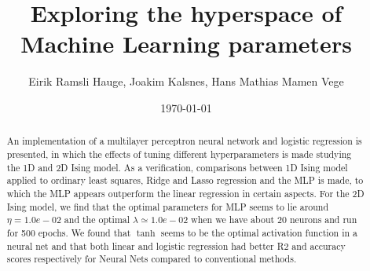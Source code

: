 \documentclass[11pt]{article}
\title{Exploring the hyperspace of Machine Learning parameters}
\author{Eirik Ramsli Hauge, Joakim Kalsnes, Hans Mathias Mamen Vege}
\date{\today}
\begin{document}
\maketitle

\begin{abstract}
An implementation of a multilayer perceptron neural network and logistic regression is presented, in which the effects of tuning different hyperparameters is made studying the 1D and 2D Ising model. As a verification, comparisons between 1D Ising model applied to ordinary least squares, Ridge and Lasso regression and the MLP is made, to which the MLP appears outperform the linear regression in certain aspects. For the 2D Ising model, we find that the optimal parameters for MLP seems to lie around $\eta= 1.0e-02$ and the optimal $\lambda \simeq 1.0e-02$ when we have about 20 neurons and run for 500 epochs. We found that $\tanh$ seems to be the optimal activation function in a neural net and that both linear and logistic regression had better R2 and accuracy scores respectively for Neural Nets compared to conventional methods.
\end{abstract}

%
%
%
%
%
%
%
%
%
%
%
%
%
%
%
%
%
\end{document}
